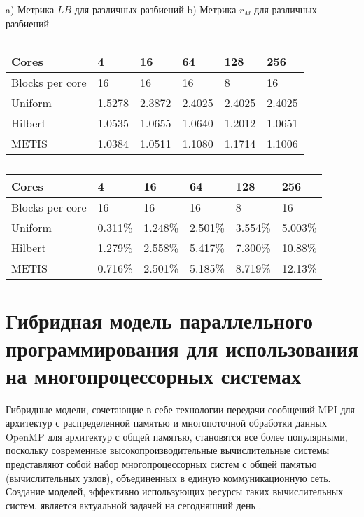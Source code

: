 \begin{table}[]
    \caption{a) Метрика $LB$ для различных разбиений b) Метрика $r_M$ для различных разбиений}\label{tab:LB}
    \begin{subtable}{.5\linewidth}
    \centering
    \caption{}
    \resizebox{0.9\textwidth}{!}
    {
    \begin{tabular}{|l|l|l|l|l|l|}
    \hline
    Cores     & 4      & 16     & 64     & 128    & 256    \\ 
    \hline
    Blocks 
    per core  & 16     & 16     & 16     & 8      & 16     \\
    \hline
    Uniform   & 1.5278 & 2.3872 & 2.4025 & 2.4025 & 2.4025 \\
    \hline
    Hilbert   & 1.0535 & 1.0655 & 1.0640 & 1.2012 & 1.0651 \\
    \hline
    METIS     & 1.0384 & 1.0511 & 1.1080 & 1.1714 & 1.1006 \\
    \hline
    \end{tabular}
    }
    \end{subtable}
    \begin{subtable}{.5\linewidth}
    \centering
    \caption{}
    \resizebox{0.92\textwidth}{!}
    {
	\begin{tabular}{|l|l|l|l|l|l|}
    \hline
    Cores     & 4       & 16      & 64      & 128     & 256     \\ 
    \hline
    Blocks 
    per core  & 16      & 16      & 16      & 8       & 16      \\
    \hline
    Uniform   & 0.311\% & 1.248\% & 2.501\% & 3.554\% & 5.003\% \\
    \hline
    Hilbert   & 1.279\% & 2.558\% & 5.417\% & 7.300\% & 10.88\% \\
    \hline
    METIS     & 0.716\% & 2.501\% & 5.185\% & 8.719\% & 12.13\% \\
    \hline
    \end{tabular}
    }
    \end{subtable}
\end{table}

\section{Гибридная модель параллельного программирования для использования на многопроцессорных системах}\label{sec:ch2/sec4}

Гибридные модели, сочетающие в себе технологии передачи сообщений MPI для архитектур с распределенной памятью и многопоточной обработки данных OpenMP для архитектур с общей памятью, становятся все более популярными, поскольку современные высокопроизводительные вычислительные системы представляют собой набор многопроцессорных систем с общей памятью (вычислительных узлов), объединенных в единую коммуникационную сеть. 
Создание моделей, эффективно использующих ресурсы таких вычислительных систем, является актуальной задачей на сегодняшний день \cite{gmd-11-1799-2018}.
	    
